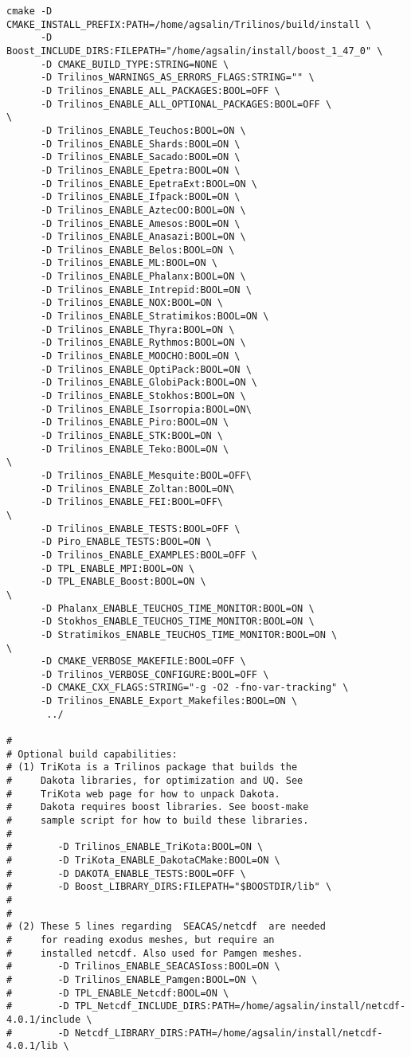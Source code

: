 \documentclass[pdf,12pt,report,strict]{SANDreport}
\theoremstyle{remark}
\begin{document}
\begin{verbatim}
cmake -D CMAKE_INSTALL_PREFIX:PATH=/home/agsalin/Trilinos/build/install \
      -D Boost_INCLUDE_DIRS:FILEPATH="/home/agsalin/install/boost_1_47_0" \
      -D CMAKE_BUILD_TYPE:STRING=NONE \
      -D Trilinos_WARNINGS_AS_ERRORS_FLAGS:STRING="" \
      -D Trilinos_ENABLE_ALL_PACKAGES:BOOL=OFF \
      -D Trilinos_ENABLE_ALL_OPTIONAL_PACKAGES:BOOL=OFF \
\
      -D Trilinos_ENABLE_Teuchos:BOOL=ON \
      -D Trilinos_ENABLE_Shards:BOOL=ON \
      -D Trilinos_ENABLE_Sacado:BOOL=ON \
      -D Trilinos_ENABLE_Epetra:BOOL=ON \
      -D Trilinos_ENABLE_EpetraExt:BOOL=ON \
      -D Trilinos_ENABLE_Ifpack:BOOL=ON \
      -D Trilinos_ENABLE_AztecOO:BOOL=ON \
      -D Trilinos_ENABLE_Amesos:BOOL=ON \
      -D Trilinos_ENABLE_Anasazi:BOOL=ON \
      -D Trilinos_ENABLE_Belos:BOOL=ON \
      -D Trilinos_ENABLE_ML:BOOL=ON \
      -D Trilinos_ENABLE_Phalanx:BOOL=ON \
      -D Trilinos_ENABLE_Intrepid:BOOL=ON \
      -D Trilinos_ENABLE_NOX:BOOL=ON \
      -D Trilinos_ENABLE_Stratimikos:BOOL=ON \
      -D Trilinos_ENABLE_Thyra:BOOL=ON \
      -D Trilinos_ENABLE_Rythmos:BOOL=ON \
      -D Trilinos_ENABLE_MOOCHO:BOOL=ON \
      -D Trilinos_ENABLE_OptiPack:BOOL=ON \
      -D Trilinos_ENABLE_GlobiPack:BOOL=ON \
      -D Trilinos_ENABLE_Stokhos:BOOL=ON \
      -D Trilinos_ENABLE_Isorropia:BOOL=ON\
      -D Trilinos_ENABLE_Piro:BOOL=ON \
      -D Trilinos_ENABLE_STK:BOOL=ON \
      -D Trilinos_ENABLE_Teko:BOOL=ON \
\
      -D Trilinos_ENABLE_Mesquite:BOOL=OFF\
      -D Trilinos_ENABLE_Zoltan:BOOL=ON\
      -D Trilinos_ENABLE_FEI:BOOL=OFF\
\
      -D Trilinos_ENABLE_TESTS:BOOL=OFF \
      -D Piro_ENABLE_TESTS:BOOL=ON \
      -D Trilinos_ENABLE_EXAMPLES:BOOL=OFF \
      -D TPL_ENABLE_MPI:BOOL=ON \
      -D TPL_ENABLE_Boost:BOOL=ON \
\
      -D Phalanx_ENABLE_TEUCHOS_TIME_MONITOR:BOOL=ON \
      -D Stokhos_ENABLE_TEUCHOS_TIME_MONITOR:BOOL=ON \
      -D Stratimikos_ENABLE_TEUCHOS_TIME_MONITOR:BOOL=ON \
\
      -D CMAKE_VERBOSE_MAKEFILE:BOOL=OFF \
      -D Trilinos_VERBOSE_CONFIGURE:BOOL=OFF \
      -D CMAKE_CXX_FLAGS:STRING="-g -O2 -fno-var-tracking" \
      -D Trilinos_ENABLE_Export_Makefiles:BOOL=ON \
       ../

#
# Optional build capabilities:
# (1) TriKota is a Trilinos package that builds the
#     Dakota libraries, for optimization and UQ. See
#     TriKota web page for how to unpack Dakota.
#     Dakota requires boost libraries. See boost-make
#     sample script for how to build these libraries.
#
#        -D Trilinos_ENABLE_TriKota:BOOL=ON \
#        -D TriKota_ENABLE_DakotaCMake:BOOL=ON \
#        -D DAKOTA_ENABLE_TESTS:BOOL=OFF \
#        -D Boost_LIBRARY_DIRS:FILEPATH="$BOOSTDIR/lib" \
#
#
# (2) These 5 lines regarding  SEACAS/netcdf  are needed
#     for reading exodus meshes, but require an
#     installed netcdf. Also used for Pamgen meshes.
#        -D Trilinos_ENABLE_SEACASIoss:BOOL=ON \
#        -D Trilinos_ENABLE_Pamgen:BOOL=ON \
#        -D TPL_ENABLE_Netcdf:BOOL=ON \
#        -D TPL_Netcdf_INCLUDE_DIRS:PATH=/home/agsalin/install/netcdf-4.0.1/include \
#        -D Netcdf_LIBRARY_DIRS:PATH=/home/agsalin/install/netcdf-4.0.1/lib \
\end{verbatim}
\end{document}
